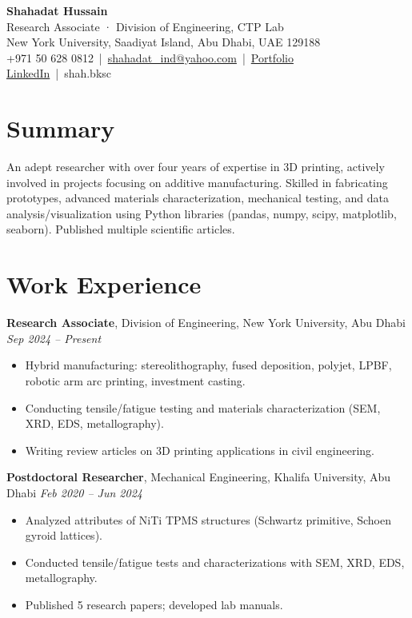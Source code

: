 \documentclass[11pt,a4paper]{article}
\begin{document}
\begin{center}
    {\LARGE \textbf{Shahadat Hussain}} \\[4pt]
    Research Associate · Division of Engineering, CTP Lab \\
    New York University, Saadiyat Island, Abu Dhabi, UAE 129188 \\
    +971 50 628 0812 \,|\, \href{mailto:shahadat_ind@yahoo.com}{shahadat\_ind@yahoo.com} \,|\, 
    \href{https://sites.google.com/view/shahadathussain}{Portfolio} \\
    \href{https://linkedin.com/in/shahadathussain}{LinkedIn} \,|\, shah.bksc
\end{center}

\vspace{0.2in}

\section*{Summary}
An adept researcher with over four years of expertise in 3D printing, actively involved in projects focusing on additive manufacturing. Skilled in fabricating prototypes, advanced materials characterization, mechanical testing, and data analysis/visualization using Python libraries (pandas, numpy, scipy, matplotlib, seaborn). Published multiple scientific articles.

\section*{Work Experience}

\textbf{Research Associate}, Division of Engineering, New York University, Abu Dhabi \hfill \textit{Sep 2024 -- Present}  
\begin{itemize}[leftmargin=*]
    \item Hybrid manufacturing: stereolithography, fused deposition, polyjet, LPBF, robotic arm arc printing, investment casting.
    \item Conducting tensile/fatigue testing and materials characterization (SEM, XRD, EDS, metallography).
    \item Writing review articles on 3D printing applications in civil engineering.
\end{itemize}

\textbf{Postdoctoral Researcher}, Mechanical Engineering, Khalifa University, Abu Dhabi \hfill \textit{Feb 2020 -- Jun 2024}  
\begin{itemize}[leftmargin=*]
    \item Analyzed attributes of NiTi TPMS structures (Schwartz primitive, Schoen gyroid lattices).
    \item Conducted tensile/fatigue tests and characterizations with SEM, XRD, EDS, metallography.
    \item Published 5 research papers; developed lab manuals.
\end{itemize}
\end{document}
